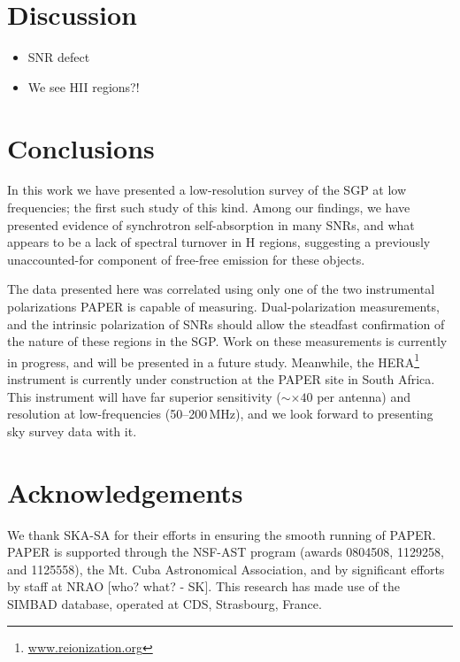 \documentclass[useAMS,usenatbib]{mn2e}
\begin{document}
\section{Discussion}
\label{sec:disc}

\begin{itemize}
\item SNR defect
\item We see HII regions?!
\end{itemize}

\section{Conclusions}
\label{sec:conc}

In this work we have presented a low-resolution survey of the SGP at low frequencies; the first such study of this kind. Among our findings, we have presented evidence of synchrotron self-absorption in many SNRs, and what appears to be a lack of spectral turnover in {H} regions, suggesting a previously unaccounted-for component of free-free emission for these objects.

The data presented here was correlated using only one of the two instrumental polarizations PAPER is capable of measuring. Dual-polarization measurements, and the intrinsic polarization of SNRs \citep[e.g.][]{Gao_v.11} should allow the steadfast confirmation of the nature of these regions in the SGP. Work on these measurements is currently in progress, and will be presented in a future study. Meanwhile, the HERA\footnote{\url{www.reionization.org}} instrument is currently under construction at the PAPER site in South Africa. This instrument will have far superior sensitivity ($\sim\times40$ per antenna) and resolution at low-frequencies (50--200\,MHz), and we look forward to presenting sky survey data with it.

\section*{Acknowledgements}
We thank SKA-SA for their efforts in ensuring the smooth running of PAPER. PAPER is supported through the NSF-AST program (awards 0804508, 1129258, and 1125558), the Mt. Cuba Astronomical Association, {\color{red}and by significant efforts by staff at NRAO [who? what? - SK]}. This research has made use of the SIMBAD database, operated at CDS, Strasbourg, France.


{}
\end{document}
